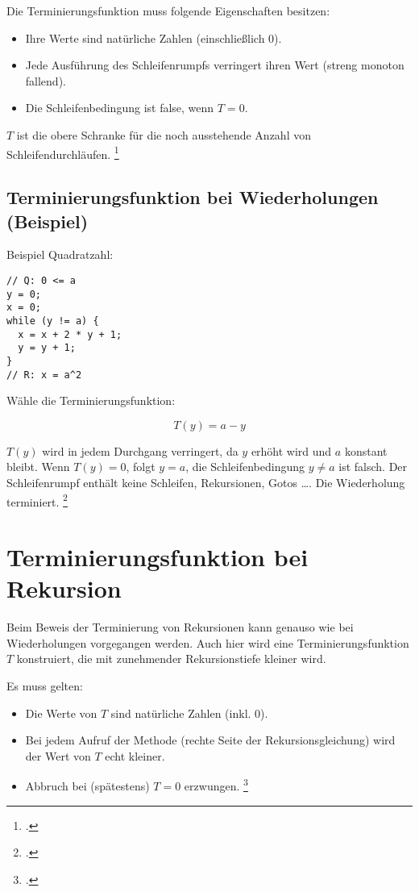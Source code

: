 \documentclass{bschlangaul-theorie}
\begin{document}
Die Terminierungsfunktion muss folgende Eigenschaften besitzen:

\begin{itemize}
\item Ihre Werte sind natürliche Zahlen (einschließlich 0).

\item Jede Ausführung des Schleifenrumpfs verringert ihren Wert (streng
monoton fallend).

\item Die Schleifenbedingung ist false, wenn $T = 0$.
\end{itemize}

$T$ ist die obere Schranke für die noch ausstehende Anzahl von
Schleifendurchläufen.
\footcite[Seite 33]{sosy:fs:5}

%

\subsection{Terminierungsfunktion bei Wiederholungen (Beispiel)}

Beispiel Quadratzahl:

\begin{verbatim}
// Q: 0 <= a
y = 0;
x = 0;
while (y != a) {
  x = x + 2 * y + 1;
  y = y + 1;
}
// R: x = a^2
\end{verbatim}

\noindent
Wähle die Terminierungsfunktion:

\begin{displaymath}
T(y) = a - y
\end{displaymath}

\noindent
$T(y)$ wird in jedem Durchgang verringert, da $y$ erhöht wird und $a$
konstant bleibt. Wenn $T(y) = 0$, folgt $y = a$, \dh die
Schleifenbedingung $y \neq a$ ist falsch. Der Schleifenrumpf enthält
keine Schleifen, Rekursionen, Gotos …. Die Wiederholung terminiert.
\footcite[Seite 34]{sosy:fs:5}

\section{Terminierungsfunktion bei Rekursion}

Beim Beweis der Terminierung von Rekursionen kann genauso wie bei
Wiederholungen vorgegangen werden. Auch hier wird eine
Terminierungsfunktion $T$ konstruiert, die mit zunehmender
Rekursionstiefe kleiner wird.

Es muss gelten:
\begin{itemize}
\item Die Werte von $T$ sind natürliche Zahlen (inkl. $0$).

\item Bei jedem Aufruf der Methode (rechte Seite der
Rekursionsgleichung) wird der Wert von $T$ echt kleiner.

\item Abbruch bei (spätestens) $T = 0$ erzwungen.
\footcite[Seite 36]{sosy:fs:5}
\end{itemize}
\end{document}
